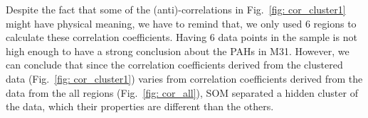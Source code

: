        Despite the fact that some of the (anti)-correlations in Fig.~\ref{fig: cor_cluster1} might have physical meaning, we have to remind that, we only used 6 regions to calculate these correlation coefficients.
       Having 6 data points in the sample is not high enough to have a strong conclusion about the PAHs in M31.%
        However, we can conclude that since the correlation coefficients derived from the clustered data (Fig.~\ref{fig: cor_cluster1}) varies from correlation coefficients derived from the data from the all regions (Fig.~\ref{fig: cor_all}), SOM separated a hidden cluster of the data, which their properties are different than the others. %
        
        
        
        
        
